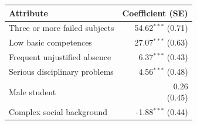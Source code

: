 \begin{tabular}{lr}
\toprule
Attribute & Coefficient (SE) \\
\midrule
Three or more failed subjects & \shortstack{54.62$^{***}$\\{\scriptsize (0.71)}} \\
Low basic competences & \shortstack{27.07$^{***}$\\{\scriptsize (0.63)}} \\
Frequent unjustified absence & \shortstack{6.37$^{***}$\\{\scriptsize (0.43)}} \\
Serious disciplinary problems & \shortstack{4.56$^{***}$\\{\scriptsize (0.48)}} \\
Male student & \shortstack{0.26\\{\scriptsize (0.45)}} \\
Complex social background & \shortstack{-1.88$^{***}$\\{\scriptsize (0.44)}} \\
\bottomrule
\end{tabular}
